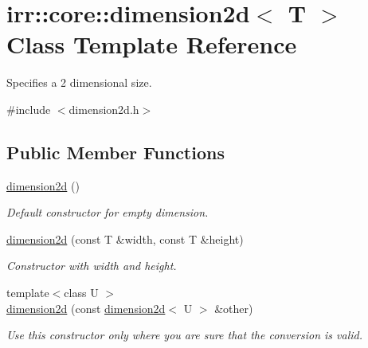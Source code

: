 \hypertarget{classirr_1_1core_1_1dimension2d}{}\section{irr\+:\+:core\+:\+:dimension2d$<$ T $>$ Class Template Reference}
\label{classirr_1_1core_1_1dimension2d}


Specifies a 2 dimensional size.  




{\ttfamily \#include $<$dimension2d.\+h$>$}

\subsection*{Public Member Functions}
\begin{DoxyCompactItemize}
\item 
\mbox{\label{classirr_1_1core_1_1dimension2d_ae0c2a30ce6283602c454901ef0bd6a04}} 
\hyperlink{classirr_1_1core_1_1dimension2d_ae0c2a30ce6283602c454901ef0bd6a04}{dimension2d} ()
\begin{DoxyCompactList}\small\item\em Default constructor for empty dimension. \end{DoxyCompactList}\item 
\mbox{\label{classirr_1_1core_1_1dimension2d_a9032aa6e975b32497ed3b570e3d03b76}} 
\hyperlink{classirr_1_1core_1_1dimension2d_a9032aa6e975b32497ed3b570e3d03b76}{dimension2d} (const T \&width, const T \&height)
\begin{DoxyCompactList}\small\item\em Constructor with width and height. \end{DoxyCompactList}\item 
\mbox{\label{classirr_1_1core_1_1dimension2d_a50814f5fc29d226104d5739350befb31}} 
{\footnotesize template$<$class U $>$ }\\\hyperlink{classirr_1_1core_1_1dimension2d_a50814f5fc29d226104d5739350befb31}{dimension2d} (const \hyperlink{classirr_1_1core_1_1dimension2d}{dimension2d}$<$ U $>$ \&other)
\begin{DoxyCompactList}\small\item\em Use this constructor only where you are sure that the conversion is valid. \end{DoxyCompactList}\item 

\end{DoxyCompactItemize}
